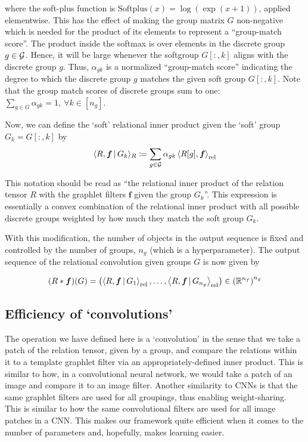 where the soft-plus function is $\text{Softplus}(x) = \log(\exp(x + 1))$, applied elementwise. This has the effect of making the group matrix $G$ non-negative which is needed for the product of its elements to represent a ``group-match score''. The product inside the softmax is over elements in the discrete group $g \in {\mathcal{G}}$. Hence, it will be large whenever the softgroup $G[:, k]$ aligns with the discrete group $g$. Thus, $\alpha_{gk}$ is a normalized ``group-match score'' indicating the degree to which the discrete group $g$ matches the given soft group $G[:,k]$. Note that the group match scores of discrete groups sum to one: $\sum_{g \in G} \alpha_{gk} = 1, \ \forall k \in [n_g]$.

Now, we can define the `soft' relational inner product given the `soft' group $G_k = G[:, k]$ by
\begin{equation}
    \label{eq:soft_relational_inner_prod}
    \langle R, \boldsymbol{f} \, \vert \, G_k \rangle_R \coloneqq \sum_{g \in {\mathcal{G}}} \alpha_{gk} \left \langle R[g], \boldsymbol{f} \right\rangle_\mathrm{rel}
\end{equation}

This notation should be read as ``the relational inner product of the relation tensor $R$ with the graphlet filters $\boldsymbol{f}$ given the group $G_k$''. This expression is essentially a convex combination of the relational inner product with all possible discrete groups weighted by how much they match the soft group $G_k$.

With this modification, the number of objects in the output sequence is fixed and controlled by the number of groups, $n_g$ (which is a hyperparameter). The output sequence of the relational convolution given groups $G$ is now given by

\begin{equation}
    \label{eq:soft_relational_convolution_groups}
    (R \ast \bm{f})(G) = \left( \left\langle R, \bm{f} \, \vert \, G_1 \right\rangle_\mathrm{rel}, \ldots, \left\langle R, \bm{f} \, \vert \, G_{n_g} \right\rangle_\mathrm{rel} \right) \in \left(\mathbb{R}^{n_f}\right)^{n_g}
\end{equation}


\subsection{Efficiency of `convolutions'}
The operation we have defined here is a `convolution' in the sense that we take a patch of the relation tensor, given by a group, and compare the relations within it to a template graphlet filter via an appropriately-defined inner product. This is similar to how, in a convolutional neural network, we would take a patch of an image and compare it to an image filter. Another similarity to CNNs is that the same graphlet filters are used for all groupings, thus enabling weight-sharing. This is similar to how the same convolutional filters are used for all image patches in a CNN. This makes our framework quite efficient when it comes to the number of parameters and, hopefully, makes learning easier.

